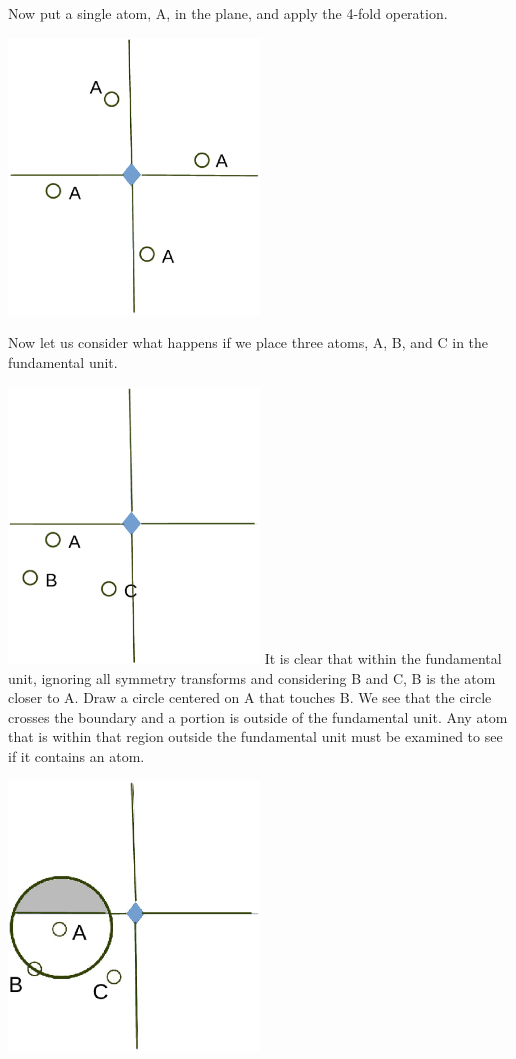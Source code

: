 \documentclass[preprint]{iucr}              %
\numberwithin{equation}{section}
\begin{document}
	Now put a single atom, A, in the plane, and apply the
	4-fold operation.
	
		\includegraphics[width = 0.5\textwidth ]{4_2}
		
	Now let us consider what happens if we place three atoms, A, B,  and C in the fundamental unit.
	
		\includegraphics[width = 0.5\textwidth ]{4_3}
		\label{4_3}
	It is clear that within the fundamental unit, ignoring all symmetry
	transforms and considering B and C, B is the atom closer to
	A. Draw a circle centered on A that touches B. We see that the
	circle crosses the boundary and a portion is outside of the
	fundamental unit. Any atom that is within that region outside the fundamental unit must be examined to see if it contains
	an atom.
	
	\includegraphics[width = 0.5\textwidth ]{4_5}
	
\end{document}
